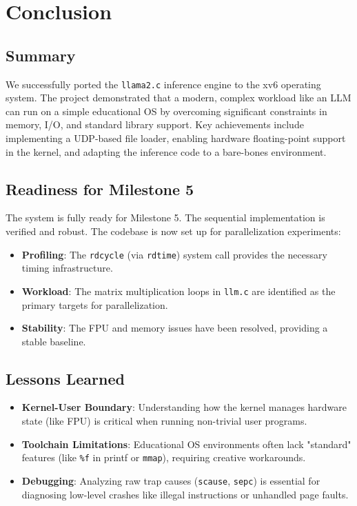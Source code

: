 \documentclass[12pt,a4paper]{article}
\begin{document}
\section{Conclusion}

\subsection{Summary}
We successfully ported the \texttt{llama2.c} inference engine to the xv6 operating system. The project demonstrated that a modern, complex workload like an LLM can run on a simple educational OS by overcoming significant constraints in memory, I/O, and standard library support. Key achievements include implementing a UDP-based file loader, enabling hardware floating-point support in the kernel, and adapting the inference code to a bare-bones environment.

\subsection{Readiness for Milestone 5}
The system is fully ready for Milestone 5. The sequential implementation is verified and robust. The codebase is now set up for parallelization experiments:
\begin{itemize}
    \item \textbf{Profiling}: The \texttt{rdcycle} (via \texttt{rdtime}) system call provides the necessary timing infrastructure.
    \item \textbf{Workload}: The matrix multiplication loops in \texttt{llm.c} are identified as the primary targets for parallelization.
    \item \textbf{Stability}: The FPU and memory issues have been resolved, providing a stable baseline.
\end{itemize}

\subsection{Lessons Learned}
\begin{itemize}
    \item \textbf{Kernel-User Boundary}: Understanding how the kernel manages hardware state (like FPU) is critical when running non-trivial user programs.
    \item \textbf{Toolchain Limitations}: Educational OS environments often lack "standard" features (like \texttt{\%f} in printf or \texttt{mmap}), requiring creative workarounds.
    \item \textbf{Debugging}: Analyzing raw trap causes (\texttt{scause}, \texttt{sepc}) is essential for diagnosing low-level crashes like illegal instructions or unhandled page faults.
\end{itemize}
\end{document}
